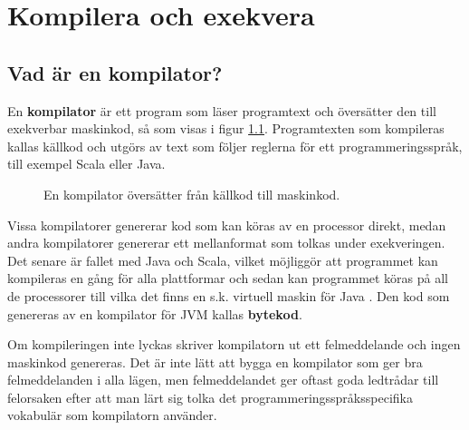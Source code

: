 
\chapter{Kompilera och exekvera}\label{appendix:compile}

\section{Vad är en kompilator?}

En \textbf{kompilator}  är ett program som läser programtext och översätter den till exekverbar maskinkod, så som visas i figur \ref{fig:appendix:compiler}. Programtexten som kompileras kallas källkod och utgörs av text som följer reglerna för ett programmeringsspråk, till exempel Scala eller Java. 

\begin{figure}[H]
\centering
{}
    \caption{En kompilator översätter från källkod till maskinkod.}
    \label{fig:appendix:compiler}
\end{figure}




Vissa kompilatorer genererar kod som kan köras av en processor direkt, medan andra kompilatorer genererar ett mellanformat som tolkas under exekveringen. Det senare är fallet med Java och Scala, vilket möjliggör att programmet kan kompileras en gång för alla plattformar och sedan kan programmet köras på all de processorer till vilka det finns en s.k. virtuell maskin för Java . Den kod som genereras av en kompilator för JVM kallas \textbf{bytekod}.

Om kompileringen inte lyckas skriver kompilatorn ut ett felmeddelande och ingen maskinkod genereras. Det är inte lätt att bygga en kompilator som ger bra felmeddelanden i alla lägen, men felmeddelandet ger oftast goda ledtrådar till felorsaken efter att man lärt sig tolka det programmeringsspråksspecifika vokabulär som kompilatorn använder.

